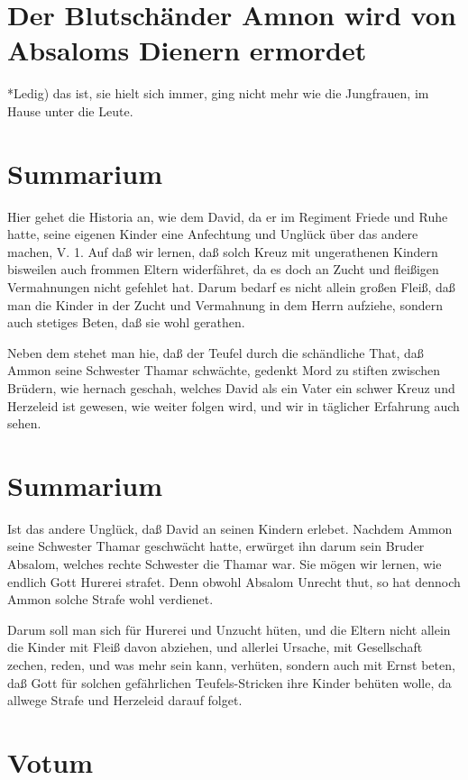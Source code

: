 \section{Der Blutschänder Amnon wird von Absaloms Dienern ermordet}

*Ledig) das ist, sie hielt sich immer, ging nicht mehr wie die Jungfrauen, im Hause unter die Leute.

\section{Summarium}

Hier gehet die Historia an, wie dem David, da er im Regiment Friede und Ruhe hatte, seine eigenen Kinder eine Anfechtung und Unglück über das andere machen, V. 1. Auf daß wir lernen, daß solch Kreuz mit ungerathenen Kindern bisweilen auch frommen Eltern widerfähret, da es doch an Zucht und fleißigen Vermahnungen nicht gefehlet hat. Darum bedarf es nicht allein großen Fleiß, daß man die Kinder in der Zucht und Vermahnung in dem Herrn aufziehe, sondern auch stetiges Beten, daß sie wohl gerathen.

Neben dem stehet man hie, daß der Teufel durch die schändliche That, daß Ammon seine Schwester Thamar schwächte, gedenkt Mord zu stiften zwischen Brüdern, wie hernach geschah, welches David als ein Vater ein schwer Kreuz und Herzeleid ist gewesen, wie weiter folgen wird, und wir in täglicher Erfahrung auch sehen.

\section{Summarium}

Ist das andere Unglück, daß David an seinen Kindern erlebet. Nachdem Ammon seine Schwester Thamar geschwächt hatte, erwürget ihn darum sein Bruder Absalom, welches rechte Schwester die Thamar war. Sie mögen wir lernen, wie endlich Gott Hurerei strafet. Denn obwohl Absalom Unrecht thut, so hat dennoch Ammon solche Strafe wohl verdienet.

Darum soll man sich für Hurerei und Unzucht hüten, und die Eltern nicht allein die Kinder mit Fleiß davon abziehen, und allerlei Ursache, mit Gesellschaft zechen, reden, und was mehr sein kann, verhüten, sondern auch mit Ernst beten, daß Gott für solchen gefährlichen Teufels-Stricken ihre Kinder behüten wolle, da allwege Strafe und Herzeleid darauf folget.

\section{Votum}

